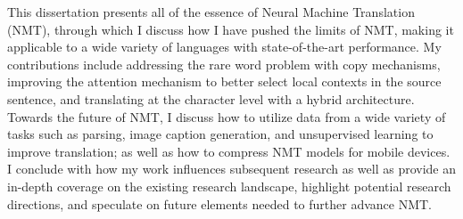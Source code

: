 
This dissertation presents all of the essence of Neural Machine Translation (NMT), through which I discuss how I have pushed the limits of NMT, making it applicable to a wide variety of languages with state-of-the-art performance. My contributions include addressing the rare word problem with copy mechanisms, improving the attention mechanism to better select local contexts in the source sentence, and translating at the character level with a hybrid architecture. Towards the future of NMT, I discuss how to utilize data from a wide variety of tasks such as parsing, image caption generation, and unsupervised learning to improve translation; as well as how to compress NMT models for mobile devices. I conclude with how my work influences subsequent research as well as provide an in-depth coverage on the existing research landscape, highlight potential research directions, and speculate on future elements needed to further advance NMT.

